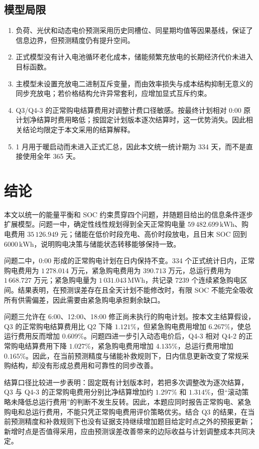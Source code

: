 \documentclass[withoutpreface]{cumcmthesis}
\begin{document}
\subsection{模型局限}
\begin{enumerate}
  \item 负荷、光伏和动态电价预测采用历史同槽位、同星期均值等因果基线，保证了信息边界，但预测精度仍有提升空间。
  \item 正式模型没有计入电池循环老化成本，储能频繁充放电的长期经济代价未进入目标函数。
  \item 主模型未设置充放电二进制互斥变量，而由效率损失与成本结构抑制无意义的同步充放电；若价格结构允许异常套利，应增加显式互斥约束。
  \item Q3/Q4-3 的正常购电结算费用对调整计费口径敏感。按最终计划相对 0:00 原计划净结算时费用略低；按固定计划版本逐次结算时，这一优势消失。因此相关结论均限定于本文采用的结算解释。
  \item 1 月用于暖启动而未进入正式汇总，因此本文统一统计期为 334 天，而不是直接使用全年 365 天。
\end{enumerate}

\section{结论}
本文以统一的能量平衡和 SOC 约束贯穿四个问题，并随题目给出的信息条件逐步扩展模型。问题一中，确定性线性规划得到全天正常购电量 $59\,482.699\,\mathrm{kWh}$、购电费用 $35\,126.949$ 元；储能在低价时段充电、高价时段放电，且日末 SOC 回到 $6000\,\mathrm{kWh}$，说明购电决策与储能状态转移能够保持一致。

问题二中，0:00 形成的正常购电计划在日内保持不变。334 个正式统计日内，正常购电费用为 $1\,278.014$ 万元，紧急购电费用为 $390.713$ 万元，总运行费用为 $1\,668.727$ 万元；紧急购电量为 $1\,031.043\,\mathrm{MWh}$，共记录 7239 个连续紧急购电区间。结果表明，在预测误差存在且全天计划不能修改时，有限 SOC 不能完全吸收所有供需偏差，因此需要由紧急购电承担剩余缺口。

问题三允许在 6:00、12:00、18:00 修正尚未执行的购电计划。按本文主结算假设，Q3 的正常购电结算费用比 Q2 下降 $1.121\%$，但紧急购电费用增加 $6.267\%$，使总运行费用反而增加 $0.609\%$。问题四进一步引入动态电价后，Q4-3 相对 Q4-2 的正常购电结算费用下降 $1.027\%$，紧急购电费用增加 $4.135\%$，总运行费用增加 $0.165\%$。因此，在当前预测精度与储能补救规则下，日内信息更新改变了常规采购结构，却没有形成总费用和可靠性的同步改善。

结算口径比较进一步表明：固定既有计划版本时，若把多次调整改为逐次结算，Q3 与 Q4-3 的正常购电费用分别比净结算增加约 $1.297\%$ 和 $1.314\%$，但“滚动策略未降低总运行费用”的判断不发生反转。因此，本题应同时报告正常购电、紧急购电和总运行费用，不能只凭正常购电费用评价策略优劣。结合 Q3 的结果，在当前预测精度和补救规则下也没有证据支持继续增加题目给定时点之外的预报更新；新增时点是否值得采用，应由预测误差改善带来的边际收益与计划调整成本共同决定。
\end{document}
